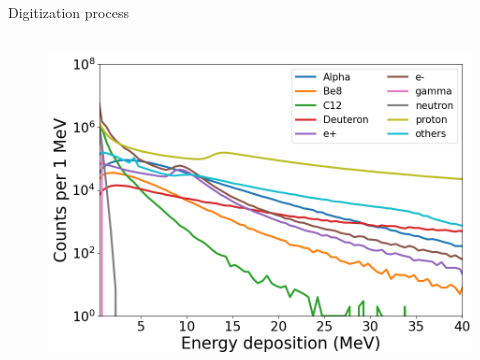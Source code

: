 \documentclass[compress, 13pt, aspectratio=169]{beamer}
\begin{document}
\begin{frame}{Digitization process}
\begin{columns}
\begin{column}{0.5\textwidth}
{\begin{figure}[t]
                \includegraphics[keepaspectratio, height = 0.5\textheight]{Edep}%
            \end{figure}
        }
        \end{column}
    \end{columns}
\end{frame}
\end{document}
